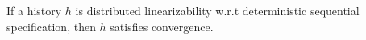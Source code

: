 


\begin{lemma}
\label{lemma:distributed linarizability implies convergence}
If a history $h$ is distributed linearizability w.r.t deterministic sequential specification, then $h$ satisfies convergence.
\end{lemma}







